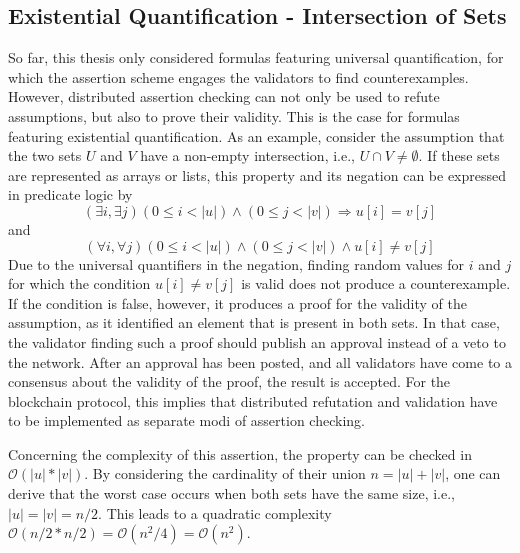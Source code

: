 \subsection{Existential Quantification - Intersection of Sets}\label{sec:existential}
So far, this thesis only considered formulas featuring universal quantification, for which the assertion scheme engages the validators to find counterexamples. However, distributed assertion checking can not only be used to refute assumptions, but also to prove their validity. This is the case for formulas featuring existential quantification. As an example, consider the assumption that the two sets $U$ and $V$ have a non-empty intersection, i.e., $U \cap V \neq \emptyset$. If these sets are represented as arrays or lists, this property and its negation can be expressed in predicate logic by 
\begin{equation}\label{eq:intersect}
  (\exists i, \exists j) (0 \le i < |u|) \land (0 \le j < |v|) \Rightarrow u[i] = v[j]
\end{equation}
and
\begin{equation}\label{eq:intersect_neg}
  (\forall i, \forall j) (0 \le i < |u|) \land (0 \le j < |v|) \land u[i] \neq v[j]
\end{equation}
Due to the universal quantifiers in the negation, finding random values for $i$ and $j$ for which the condition $u[i] \neq v[j]$ is valid does not produce a counterexample. If the condition is false, however, it produces a proof for the validity of the assumption, as it identified an element that is present in both sets. In that case, the validator finding such a proof should publish an approval instead of a veto to the network. After an approval has been posted, and all validators have come to a consensus about the validity of the proof, the result is accepted. For the blockchain protocol, this implies that distributed refutation and validation have to be implemented as separate modi of assertion checking.

Concerning the complexity of this assertion, the property can be checked in $\mathcal{O}(|u|*|v|)$. By considering the cardinality of their union $n = |u|+|v|$, one can derive that the worst case occurs when both sets have the same size, i.e., $|u| = |v| = n/2$. This leads to a quadratic complexity $\mathcal{O}(n/2 * n/2) = \mathcal{O}(n^2/4) = \mathcal{O}(n^2)$.

